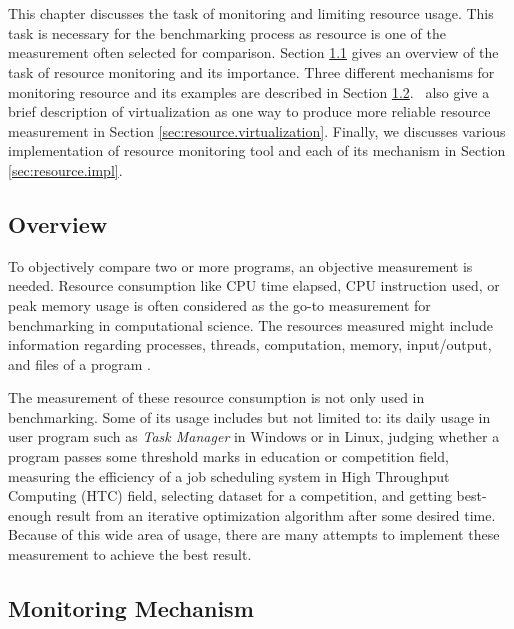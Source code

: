 \chapter{\babEmpat}

This chapter discusses the task of monitoring and limiting resource usage.
This task is necessary for the benchmarking process as resource is one of the measurement often selected for comparison.
Section \ref{sec:resource.overview} gives an overview of the task of resource monitoring and its importance.
Three different mechanisms for monitoring resource and its examples are described in Section \ref{sec:resource.mechanism}.
\First~also give a brief description of virtualization as one way to produce more reliable resource measurement in Section \ref{sec:resource.virtualization}.
Finally, we discusses various implementation of resource monitoring tool and each of its mechanism in Section \ref{sec:resource.impl}.

\section{Overview}
\label{sec:resource.overview}

To objectively compare two or more programs, an objective measurement is needed.
Resource consumption like CPU time elapsed, CPU instruction used, or peak memory usage is often considered as the go-to measurement for benchmarking in computational science.
The resources measured might include information regarding processes, threads, computation, memory, input/output, and files of a program \citep{juvePracticalResourceMonitoring2015}.

The measurement of these resource consumption is not only used in benchmarking.
Some of its usage includes but not limited to:
its daily usage in user program such as \textit{Task Manager} in Windows or  in Linux,
judging whether a program passes some threshold marks in education or competition field,
measuring the efficiency of a job scheduling system in High Throughput Computing (HTC) field,
selecting dataset for a competition,
and getting best-enough result from an iterative optimization algorithm after some desired time.
Because of this wide area of usage, there are many attempts to implement these measurement to achieve the best result.

\section{Monitoring Mechanism}
\label{sec:resource.mechanism}

